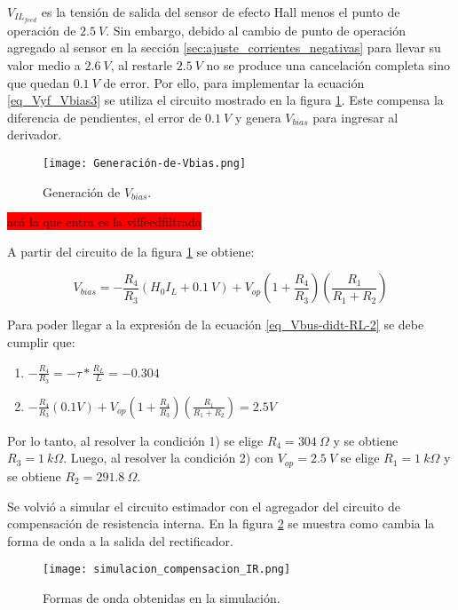 $V_{IL_{feed}}$ es la tensión de salida del sensor de efecto Hall menos el punto de operación de $2.5\:V$. Sin embargo, debido al cambio de punto de operación agregado al sensor en la sección \ref{sec:ajuste_corrientes_negativas} para llevar su valor medio a $2.6\:V$, al restarle $2.5\:V$ no se produce una cancelación completa sino que quedan $0.1\:V$ de error. Por ello, para implementar la ecuación  \ref{eq_Vyf_Vbias3} se utiliza el circuito mostrado en la figura \ref{fig:img_Generación_de_Vbias}. Este compensa la diferencia de pendientes, el error de $0.1\:V$ y genera $V_{bias}$ para ingresar al derivador.

\begin{figure}[H]
	\centering
	\texttt{[image: Generación-de-Vbias.png]}
	\caption{Generación de $V_{bias}$.}
	\label{fig:img_Generación_de_Vbias}
\end{figure}

\colorbox{red}{acá la que entra es la  vilfeedfiltrada}

A partir del circuito de la figura \ref{fig:img_Generación_de_Vbias} se obtiene:

\begin{equation} \label{eq_Vyf-Vbias3}
	V_{bias} =-\frac{R_4}{R_3}(H_0I_L+ 0.1\:V)+V_{op}(1+\frac{ R_4}{R_3})(\frac{R_1}{R_1+R_2})
\end{equation}

Para poder llegar a la expresión de la ecuación \ref{eq_Vbus-didt-RL-2} se debe cumplir que:

\begin{enumerate}
	\item  $-\frac{R_4}{R_3}=- \tau *\frac{R_L}{L}= -0.304$  
	
	\item  $-\frac{R_4}{R_3}(0.1V)+V_{op}(1+\frac{ R_4}{R_3})(\frac{R_1}{R_1+R_2}) = 2.5V$     
\end{enumerate}

Por lo tanto, al resolver la condición 1) se elige $R_4 = 304\: \Omega$ y se obtiene $R_3=1\:k\Omega$. Luego, al resolver la condición 2) con $V_{op}=2.5\:V$ se elige $R_1=1\:k\Omega$ y se obtiene $R_{2}=291.8\:\Omega$.

Se volvió a simular el circuito estimador con el agregador del circuito de compensación de resistencia interna. En la figura \ref{fig:img_Formas_de_onda_obtenidas_en_la_simulación} se muestra como cambia la forma de onda a la salida del rectificador.

\begin{figure}[H]
	\centering
	\texttt{[image: simulacion\_compensacion\_IR.png]}
	\caption{Formas de onda obtenidas en la simulación.}
	\label{fig:img_Formas_de_onda_obtenidas_en_la_simulación}
\end{figure}

